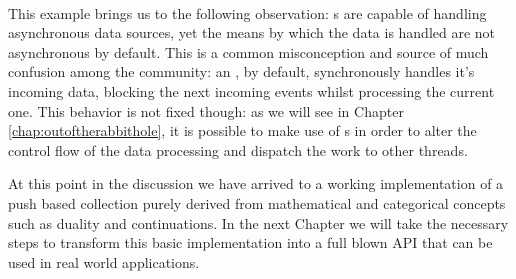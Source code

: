 \\

This example brings us to the following observation: s are capable of handling asynchronous data sources, yet the means by which the data is handled are not asynchronous by default. This is a common misconception and source of much confusion among the community: an , by default, synchronously handles it's incoming data, blocking the next incoming events whilst processing the current one. This behavior is not fixed though: as we will see in Chapter \ref{chap:outoftherabbithole}, it is possible to make use of s in order to alter the control flow of the data processing and dispatch the work to other threads.

At this point in the discussion we have arrived to a working implementation of a push based collection purely derived from mathematical and categorical concepts such as duality and continuations. In the next Chapter we will take the necessary steps to transform this basic implementation into a full blown API that can be used in real world applications.